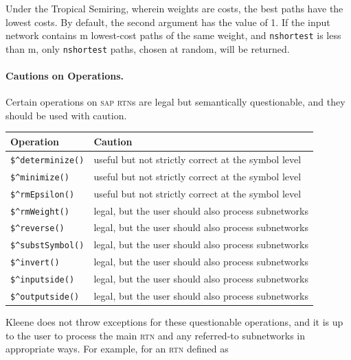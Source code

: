 \documentclass[letterpaper,12pt]{article}
\newcommand{\acro}{\textsc}
\begin{document}
Under the Tropical Semiring, wherein weights are costs, the best paths
have the lowest costs.  By default, the second argument has the value of
1.  If the input network contains m lowest-cost paths of the same weight,
and \texttt{nshortest} is less than m, only \texttt{nshortest} paths,
chosen at random, will be returned.  

\paragraph{Cautions on Operations.}

Certain operations on \acro{sap} \acro{rtn}s are legal but semantically 
questionable, and
they should be used with caution.

\vspace{.5cm}

\noindent
\begin{tabular}{|l|p{9cm}|}
\hline
\textbf{Operation} & \textbf{Caution} \\
\hline
\hline
\verb!$^determinize()! & useful but not strictly correct at the symbol level \\
\hline
\verb!$^minimize()! & useful but not strictly correct at the symbol level \\
\hline
\verb!$^rmEpsilon()! & useful but not strictly correct at the symbol level \\
\hline
\hline
\verb!$^rmWeight()! & legal, but the user should also process subnetworks \\
\hline
\verb!$^reverse()! & legal, but the user should also process subnetworks \\
\hline
\verb!$^substSymbol()! & legal, but the user should also process subnetworks \\
\hline
\verb!$^invert()! & legal, but the user should also process subnetworks \\
\hline
\verb!$^inputside()! & legal, but the user should also process subnetworks \\
\hline
\verb!$^outputside()! & legal, but the user should also process subnetworks \\
\hline
\end{tabular}

\vspace{.5cm}

\noindent
Kleene does not throw exceptions for these questionable operations, and it is
up to the user to process the main \acro{rtn} and any referred-to subnetworks
in appropriate ways.  For example, for an \acro{rtn} defined as
\end{document}
